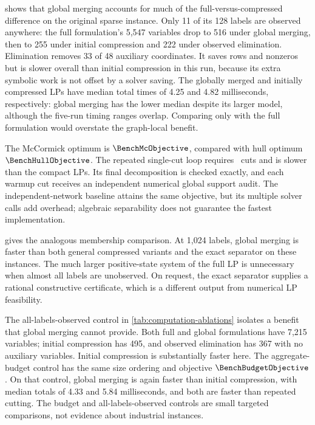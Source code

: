 



 shows that global merging accounts for much
of the full-versus-compressed difference on the original sparse instance.
Only 11 of its 128 labels are observed anywhere: the full formulation's
5,547 variables drop to 516 under global merging, then to 255 under initial
compression and 222 under observed elimination. Elimination removes 33 of
48 auxiliary coordinates. It saves rows and nonzeros but is slower overall
than initial compression in this run, because its extra symbolic work is not
offset by a solver saving. The globally merged and initially compressed
LPs have median total times of 4.25 and 4.82 milliseconds, respectively:
global merging has the lower median despite its larger model, although the
five-run timing ranges overlap. Comparing only with the full formulation
would overstate the graph-local benefit.

The McCormick optimum is $\BenchMcObjective$, compared with hull optimum
$\BenchHullObjective$. The repeated single-cut loop requires
\BenchCutCount\ cuts and is slower than the compact LPs. Its final
decomposition is checked exactly, and each warmup cut receives an independent
numerical global support audit. The independent-network baseline attains
the same objective, but its multiple solver calls add overhead; algebraic
separability does not guarantee the fastest implementation.

 gives the analogous membership comparison.
At 1,024 labels, global merging is faster than both general compressed
variants and the exact separator on these instances. The much larger
positive-state system of the full LP is unnecessary when almost all labels
are unobserved. On request, the exact separator supplies a rational
constructive certificate, which is a different output from numerical LP
feasibility.

The all-labels-observed control in \cref{tab:computation-ablations}
isolates a benefit that global merging cannot provide. Both full and global
formulations have 7,215 variables; initial compression has 495, and observed
elimination has 367 with no auxiliary variables. Initial compression is
substantially faster here. The aggregate-budget control has the same size
ordering and objective $\BenchBudgetObjective$. On that control, global
merging is again faster than initial compression, with median totals of
4.33 and 5.84 milliseconds, and both are faster than repeated cutting.
The budget and all-labels-observed controls are small targeted comparisons,
not evidence about industrial instances.

